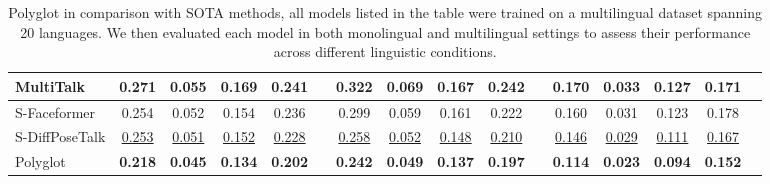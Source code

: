 \documentclass[a4paper, 10pt, conference]{ieeeconf}      %
\begin{document}
\begin{table}[ht!]
{\begin{tabular}{@{}l@{\hspace{0.1cm}}ccccccccccccccc@{}}
        MultiTalk & 0.271 & 0.055 & 0.169 & 0.241 && 0.322 & 0.069 & 0.167 & 0.242 && 0.170 & 0.033 & 0.127 & 0.171 \\
        
        \midrule

        S-Faceformer & 0.254 & 0.052 & 0.154 & 0.236 && 0.299 & 0.059 & 0.161 & 0.222 && 0.160 & 0.031 & 0.123 & 0.178 \\

        S-DiffPoseTalk & \underline{0.253} & \underline{0.051} & \underline{0.152} & \underline{0.228} && \underline{0.258} & \underline{0.052} & \underline{0.148} & \underline{0.210} && \underline{0.146} & \underline{0.029} & \underline{0.111} & \underline{0.167} \\
        
        \midrule

        Polyglot & \textbf{0.218} & \textbf{0.045} & \textbf{0.134} & \textbf{0.202} && \textbf{0.242} & \textbf{0.049} & \textbf{0.137} & \textbf{0.197} && \textbf{0.114} & \textbf{0.023} & \textbf{0.094} & \textbf{0.152} \\
        
        \bottomrule
        \end{tabular}
        }
        \caption{Polyglot in comparison with SOTA methods, all models listed in the table were trained on a multilingual dataset spanning 20 languages. We then evaluated each model in both monolingual and multilingual settings to assess their performance across different linguistic conditions.}
        \label{tab:add_quantitative}
\end{table}

{\small


}
\end{document}
